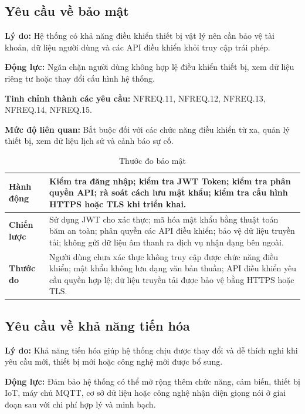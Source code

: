 \documentclass[a4paper,12pt]{article}
\begin{document}
\subsection{Yêu cầu về bảo mật}

\textbf{Lý do:} Hệ thống có khả năng điều khiển thiết bị vật lý nên cần bảo vệ tài khoản, dữ liệu người dùng và các API điều khiển khỏi truy cập trái phép.

\textbf{Động lực:} Ngăn chặn người dùng không hợp lệ điều khiển thiết bị, xem dữ liệu riêng tư hoặc thay đổi cấu hình hệ thống.

\textbf{Tinh chỉnh thành các yêu cầu:} NFREQ.11, NFREQ.12, NFREQ.13, NFREQ.14, NFREQ.15.

\textbf{Mức độ liên quan:} Bắt buộc đối với các chức năng điều khiển từ xa, quản lý thiết bị, xem dữ liệu lịch sử và cảnh báo sự cố.

\begin{table}[H]
\centering
\caption{Thước đo bảo mật}
\small
\begin{tabularx}{\linewidth}{|p{3cm}|X|}
\hline
\textbf{Hành động} & Kiểm tra đăng nhập; kiểm tra JWT Token; kiểm tra phân quyền API; rà soát cách lưu mật khẩu; kiểm tra cấu hình HTTPS hoặc TLS khi triển khai. \\
\hline
\textbf{Chiến lược} & Sử dụng JWT cho xác thực; mã hóa mật khẩu bằng thuật toán băm an toàn; phân quyền các API điều khiển; bảo vệ dữ liệu truyền tải; không gửi dữ liệu âm thanh ra dịch vụ nhận dạng bên ngoài. \\
\hline
\textbf{Thước đo} & Người dùng chưa xác thực không truy cập được chức năng điều khiển; mật khẩu không lưu dạng văn bản thuần; API điều khiển yêu cầu quyền hợp lệ; dữ liệu truyền tải được bảo vệ bằng HTTPS hoặc TLS. \\
\hline
\end{tabularx}
\end{table}

\subsection{Yêu cầu về khả năng tiến hóa}

\textbf{Lý do:} Khả năng tiến hóa giúp hệ thống chịu được thay đổi và dễ thích nghi khi yêu cầu mới, thiết bị mới hoặc công nghệ mới được bổ sung.

\textbf{Động lực:} Đảm bảo hệ thống có thể mở rộng thêm chức năng, cảm biến, thiết bị IoT, máy chủ MQTT, cơ sở dữ liệu hoặc công nghệ nhận diện giọng nói ở giai đoạn sau với chi phí hợp lý và minh bạch.
\end{document}
